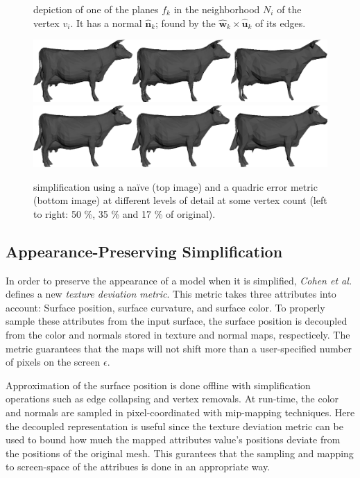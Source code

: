 \begin{figure}[h]
\begin{minipage}{0.485\textwidth}
        \caption{depiction of one of the planes \(f_k\) in the neighborhood \(N_i\) of the vertex \(v_i\). It has a normal \(\mathbf{\hat{n}}_k\); found by the \(\mathbf{\hat{w}}_k \times \mathbf{\hat{u}}_k\) of its edges.}
        \label{fig:quadrics}
    \end{minipage}
\end{figure}

\begin{figure}[h]
    \centering
    \includegraphics[width=\textwidth]{figures/naive_simplification.png}
    \includegraphics[width=\textwidth]{figures/quadric_simplification.png}
    \caption{simplification using a na\"ive (top image) and a quadric error metric (bottom image) at different levels of detail at some vertex count (left to right: 50 \%, 35 \% and 17 \% of original).}
    \label{fig:naive_vs_quadric}
\end{figure}

\subsection{Appearance-Preserving Simplification} \label{sec:appearance-preserving_simplification}
In order to preserve the appearance of a model when it is simplified, \emph{Cohen et al.} \cite{cohen1998appearance} defines a new \emph{texture deviation metric}. This metric takes three attributes into account: Surface position, surface curvature, and surface color. To properly sample these attributes from the input surface, the surface position is decoupled from the color and normals stored in texture and normal maps, respecticely. The metric guarantees that the maps will not shift more than a user-specified number of pixels on the screen $\epsilon$.

Approximation of the surface position is done offline with simplification operations such as edge collapsing and vertex removals. At run-time, the color and normals are sampled in pixel-coordinated with mip-mapping techniques. Here the decoupled representation is useful since the texture deviation metric can be used to bound how much the mapped attributes value's positions deviate from the positions of the original mesh. This gurantees that the sampling and mapping to screen-space of the attribues is done in an appropriate way.

